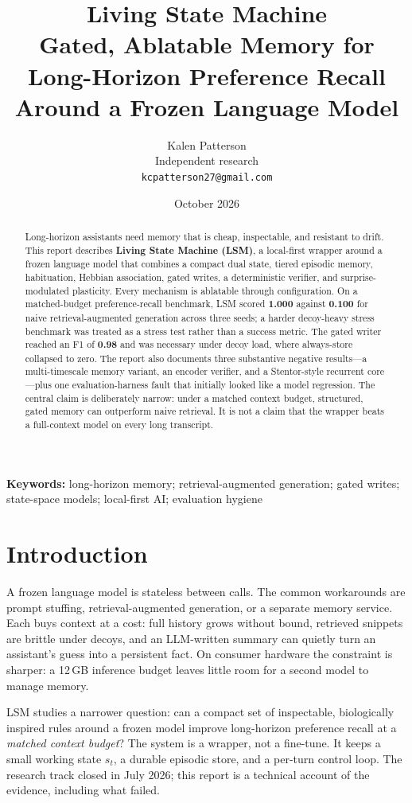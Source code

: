 \documentclass[11pt]{article}
\title{Living State Machine\\[4pt]
\large Gated, Ablatable Memory for Long-Horizon Preference Recall\\Around a Frozen Language Model}
\author{Kalen Patterson\\\small Independent research\\\small\texttt{kcpatterson27@gmail.com}}
\date{October 2026}
\begin{document}
\maketitle

\begin{abstract}
Long-horizon assistants need memory that is cheap, inspectable, and resistant to drift. This report describes \textbf{Living State Machine (LSM)}, a local-first wrapper around a frozen language model that combines a compact dual state, tiered episodic memory, habituation, Hebbian association, gated writes, a deterministic verifier, and surprise-modulated plasticity. Every mechanism is ablatable through configuration. On a matched-budget preference-recall benchmark, LSM scored \textbf{1.000} against \textbf{0.100} for naive retrieval-augmented generation across three seeds; a harder decoy-heavy stress benchmark was treated as a stress test rather than a success metric. The gated writer reached an F1 of \textbf{0.98} and was necessary under decoy load, where always-store collapsed to zero. The report also documents three substantive negative results---a multi-timescale memory variant, an encoder verifier, and a Stentor-style recurrent core---plus one evaluation-harness fault that initially looked like a model regression. The central claim is deliberately narrow: under a matched context budget, structured, gated memory can outperform naive retrieval. It is not a claim that the wrapper beats a full-context model on every long transcript.
\end{abstract}

\noindent\textbf{Keywords:} long-horizon memory; retrieval-augmented generation; gated writes; state-space models; local-first AI; evaluation hygiene

\section{Introduction}
A frozen language model is stateless between calls. The common workarounds are prompt stuffing, retrieval-augmented generation, or a separate memory service. Each buys context at a cost: full history grows without bound, retrieved snippets are brittle under decoys, and an LLM-written summary can quietly turn an assistant's guess into a persistent fact. On consumer hardware the constraint is sharper: a 12\,GB inference budget leaves little room for a second model to manage memory.

LSM studies a narrower question: can a compact set of inspectable, biologically inspired rules around a frozen model improve long-horizon preference recall at a \emph{matched context budget}? The system is a wrapper, not a fine-tune. It keeps a small working state $s_t$, a durable episodic store, and a per-turn control loop. The research track closed in July 2026; this report is a technical account of the evidence, including what failed.
\end{document}
